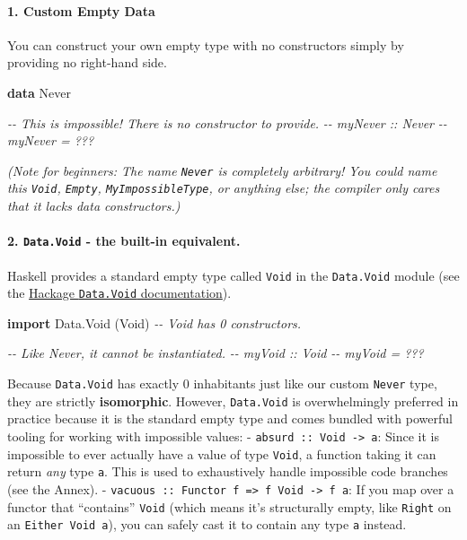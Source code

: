 \documentclass[
]{article}
\newenvironment{Shaded}{}{}
\newcommand{\CommentTok}[1]{\textcolor[rgb]{0.38,0.63,0.69}{\textit{#1}}}
\newcommand{\DataTypeTok}[1]{\textcolor[rgb]{0.56,0.13,0.00}{#1}}
\newcommand{\KeywordTok}[1]{\textcolor[rgb]{0.00,0.44,0.13}{\textbf{#1}}}
\newcommand{\NormalTok}[1]{#1}
\begin{document}
\paragraph{1. Custom Empty Data}\label{custom-empty-data}

You can construct your own empty type with no constructors simply by
providing no right-hand side.

\begin{Shaded}
\begin{Highlighting}[]
\KeywordTok{data} \DataTypeTok{Never}

\CommentTok{{-}{-} This is impossible! There is no constructor to provide.}
\CommentTok{{-}{-} myNever :: Never}
\CommentTok{{-}{-} myNever = ???}
\end{Highlighting}
\end{Shaded}

\emph{(Note for beginners: The name \texttt{Never} is completely
arbitrary! You could name this \texttt{Void}, \texttt{Empty},
\texttt{MyImpossibleType}, or anything else; the compiler only cares
that it lacks data constructors.)}

\paragraph{\texorpdfstring{2. \texttt{Data.Void} - the built-in
equivalent.}{2. Data.Void - the built-in equivalent.}}\label{data.void---the-built-in-equivalent.}

Haskell provides a standard empty type called \texttt{Void} in the
\texttt{Data.Void} module (see the
\href{https://hackage.haskell.org/package/base/docs/Data-Void.html}{Hackage
\texttt{Data.Void} documentation}).

\begin{Shaded}
\begin{Highlighting}[]
\KeywordTok{import} \DataTypeTok{Data.Void}\NormalTok{ (}\DataTypeTok{Void}\NormalTok{)}
\CommentTok{{-}{-} Void has 0 constructors.}

\CommentTok{{-}{-} Like Never, it cannot be instantiated.}
\CommentTok{{-}{-} myVoid :: Void}
\CommentTok{{-}{-} myVoid = ???}
\end{Highlighting}
\end{Shaded}

Because \texttt{Data.Void} has exactly 0 inhabitants just like our
custom \texttt{Never} type, they are strictly \textbf{isomorphic}.
However, \texttt{Data.Void} is overwhelmingly preferred in practice
because it is the standard empty type and comes bundled with powerful
tooling for working with impossible values: -
\texttt{absurd\ ::\ Void\ -\textgreater{}\ a}: Since it is impossible to
ever actually have a value of type \texttt{Void}, a function taking it
can return \emph{any} type \texttt{a}. This is used to exhaustively
handle impossible code branches (see the Annex). -
\texttt{vacuous\ ::\ Functor\ f\ =\textgreater{}\ f\ Void\ -\textgreater{}\ f\ a}:
If you map over a functor that ``contains'' \texttt{Void} (which means
it's structurally empty, like \texttt{Right} on an
\texttt{Either\ Void\ a}), you can safely cast it to contain any type
\texttt{a} instead.
\end{document}
